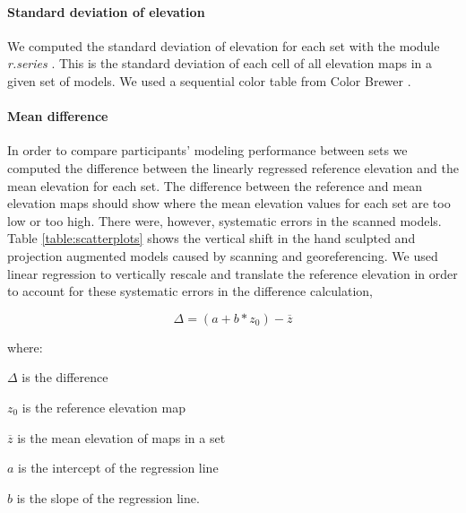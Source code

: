 \documentclass[prodmode,acmtochi]{acmsmall} %
\begin{document}
\paragraph{Standard deviation of elevation}
We computed 
the standard deviation of elevation
for each set
with the module \textit{r.series} \cite{r.series}.
This is the standard deviation of each cell 
of all elevation maps in a given set of models.
We used a sequential color table from Color Brewer
\cite{Brewer1994,ColorBrewer}.

\paragraph{Mean difference}
In order to compare participants' modeling performance between sets 
we computed the difference 
between the linearly regressed reference elevation and 
the mean elevation for each set.
%
The difference between the reference and mean elevation maps should show
where the mean elevation values for each set are too low or too high. 
%
There were, however, systematic errors in the scanned models.
%
Table \ref{table:scatterplots} shows the vertical shift 
in the hand sculpted and projection augmented models 
caused by scanning and georeferencing.
%
We used linear regression 
to vertically rescale and translate the reference elevation 
in order to account for these systematic errors
in the difference calculation,

\begin{equation}
\label{eq:regressed_mean_difference}
\Delta = (a + b * z_0) - \overline{z}
\end{equation}

where:

\hspace*{1em} $\Delta$ is the difference

\hspace*{1em} $z_0$ is the reference elevation map

\hspace*{1em} $\overline{z}$ is the mean elevation of maps in a set

\hspace*{1em} $a$ is the intercept of the regression line

\hspace*{1em} $b$ is the slope of the regression line.\\
\end{document}
